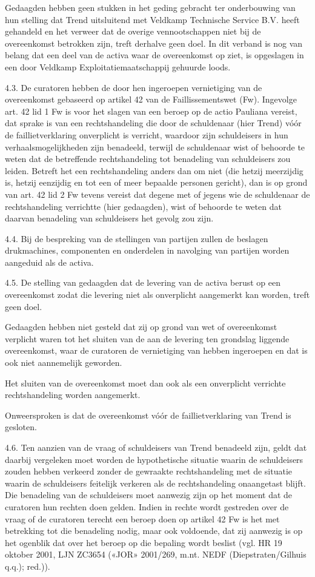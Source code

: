 \documentclass[
  dutch,
  a4paper,
]{article}
\begin{document}
Gedaagden hebben geen stukken in het geding gebracht ter onderbouwing van hun stelling dat Trend uitsluitend met Veldkamp Technische Service B.V. heeft gehandeld en het verweer dat de overige vennootschappen niet bij de overeenkomst betrokken zijn, treft derhalve geen doel. In dit verband is nog van belang dat een deel van de activa waar de overeenkomst op ziet, is opgeslagen in een door Veldkamp Exploitatiemaatschappij gehuurde loods.

4.3. De curatoren hebben de door hen ingeroepen vernietiging van de overeenkomst gebaseerd op artikel 42 van de Faillissementswet (Fw). Ingevolge art. 42 lid 1 Fw is voor het slagen van een beroep op de actio Pauliana vereist, dat sprake is van een rechtshandeling die door de schuldenaar (hier Trend) vóór de faillietverklaring onverplicht is verricht, waardoor zijn schuldeisers in hun verhaalsmogelijkheden zijn benadeeld, terwijl de schuldenaar wist of behoorde te weten dat de betreffende rechtshandeling tot benadeling van schuldeisers zou leiden. Betreft het een rechtshandeling anders dan om niet (die hetzij meerzijdig is, hetzij eenzijdig en tot een of meer bepaalde personen gericht), dan is op grond van art. 42 lid 2 Fw tevens vereist dat degene met of jegens wie de schuldenaar de rechtshandeling verrichtte (hier gedaagden), wist of behoorde te weten dat daarvan benadeling van schuldeisers het gevolg zou zijn.

4.4. Bij de bespreking van de stellingen van partijen zullen de beslagen drukmachines, componenten en onderdelen in navolging van partijen worden aangeduid als de activa.

4.5. De stelling van gedaagden dat de levering van de activa berust op een overeenkomst zodat die levering niet als onverplicht aangemerkt kan worden, treft geen doel.

Gedaagden hebben niet gesteld dat zij op grond van wet of overeenkomst verplicht waren tot het sluiten van de aan de levering ten grondslag liggende overeenkomst, waar de curatoren de vernietiging van hebben ingeroepen en dat is ook niet aannemelijk geworden.

Het sluiten van de overeenkomst moet dan ook als een onverplicht verrichte rechtshandeling worden aangemerkt.

Onweersproken is dat de overeenkomst vóór de faillietverklaring van Trend is gesloten.

4.6. Ten aanzien van de vraag of schuldeisers van Trend benadeeld zijn, geldt dat daarbij vergeleken moet worden de hypothetische situatie waarin de schuldeisers zouden hebben verkeerd zonder de gewraakte rechtshandeling met de situatie waarin de schuldeisers feitelijk verkeren als de rechtshandeling onaangetast blijft. Die benadeling van de schuldeisers moet aanwezig zijn op het moment dat de curatoren hun rechten doen gelden. Indien in rechte wordt gestreden over de vraag of de curatoren terecht een beroep doen op artikel 42 Fw is het met betrekking tot die benadeling nodig, maar ook voldoende, dat zij aanwezig is op het ogenblik dat over het beroep op die bepaling wordt beslist (vgl. HR 19 oktober 2001, LJN ZC3654 («JOR» 2001/269, m.nt. NEDF (Diepstraten/Gilhuis q.q.); red.)).
\end{document}

